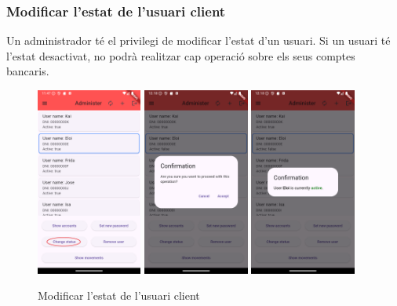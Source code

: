 \documentclass[a4paper,12pt,twoside]{ThesisStyle}
\begin{document}
\clearpage
\subsubsection{Modificar l'estat de l'usuari client}
\label{subsubsec: Modificar l'estat de l'usuari client}

Un administrador té el privilegi de modificar l'estat d'un usuari. Si un usuari té l'estat desactivat, no podrà realitzar cap operació sobre els seus comptes bancaris.

\begin{figure}[h]
    \centering
    \includegraphics[width=0.31\textwidth]{imatges/mainAdmin3.png}
    \includegraphics[width=0.31\textwidth]{imatges/confirmation.png}
    \includegraphics[width=0.31\textwidth]{imatges/confirmacion1.png}
    \caption{Modificar l'estat de l'usuari client}
    \label{fig: Modificar l'estat de l'usuari client}
\end{figure}
\end{document}
